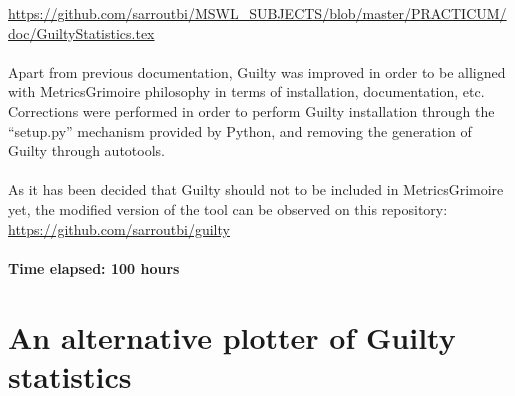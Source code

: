 \documentclass[11pt]{article}
\begin{document}
\url{https://github.com/sarroutbi/MSWL_SUBJECTS/blob/master/PRACTICUM/doc/GuiltyStatistics.tex}\\
\\
Apart from previous documentation, Guilty was improved in order to be alligned with MetricsGrimoire philosophy in terms of installation, documentation, etc.
Corrections were performed in order to perform Guilty installation through the ``setup.py'' mechanism provided by Python, and removing the generation of Guilty through autotools.\\
\\
As it has been decided that Guilty should not to be included in MetricsGrimoire yet, the modified version of the tool can be observed on this repository:\\

\url{https://github.com/sarroutbi/guilty}\\
\\
\textbf{Time elapsed: 100 hours}

\section{An alternative plotter of Guilty statistics}
\end{document}
